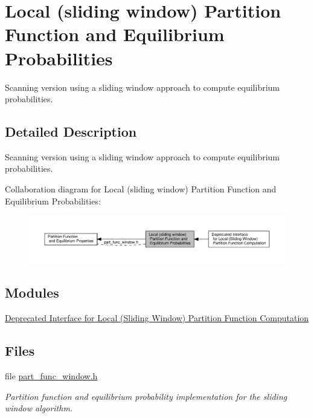 \hypertarget{group__part__func__window}{}\section{Local (sliding window) Partition Function and Equilibrium Probabilities}
\label{group__part__func__window}


Scanning version using a sliding window approach to compute equilibrium probabilities.  




\subsection{Detailed Description}
Scanning version using a sliding window approach to compute equilibrium probabilities. 

Collaboration diagram for Local (sliding window) Partition Function and Equilibrium Probabilities\+:
\nopagebreak
\begin{figure}[H]
\begin{center}
\leavevmode
\includegraphics[width=350pt]{group__part__func__window}
\end{center}
\end{figure}
\subsection*{Modules}
\begin{DoxyCompactItemize}
\item 
\hyperlink{group__part__func__window__deprecated}{Deprecated Interface for Local (\+Sliding Window) Partition Function Computation}
\end{DoxyCompactItemize}
\subsection*{Files}
\begin{DoxyCompactItemize}
\item 
file \hyperlink{part__func__window_8h}{part\+\_\+func\+\_\+window.\+h}
\begin{DoxyCompactList}\small\item\em Partition function and equilibrium probability implementation for the sliding window algorithm. \end{DoxyCompactList}\end{DoxyCompactItemize}
